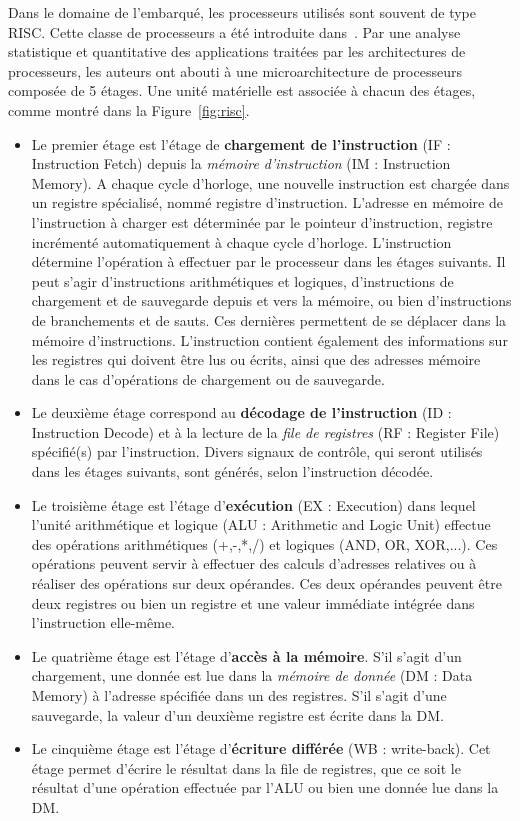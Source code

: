 Dans le domaine de l'embarqué, les processeurs utilisés sont souvent de type RISC. Cette classe de processeurs a été introduite dans~\cite{hennessy2011computer}. Par une analyse statistique et quantitative des applications traitées par les architectures de processeurs, les auteurs ont abouti à une microarchitecture de processeurs composée de 5 étages. Une unité matérielle est associée à chacun des étages, comme montré dans la Figure~\ref{fig:risc}.

\begin{itemize}
  \item Le premier étage est l'étage de \textbf{chargement de l'instruction} (IF : Instruction Fetch) depuis la \textit{mémoire d'instruction} (IM : Instruction Memory). A chaque cycle d'horloge, une nouvelle instruction est chargée dans un registre spécialisé, nommé registre d'instruction. L'adresse en mémoire de l'instruction à charger est déterminée par le pointeur d'instruction, registre incrémenté automatiquement à chaque cycle d'horloge. L'instruction détermine l'opération à effectuer par le processeur dans les étages suivants. Il peut s'agir d'instructions arithmétiques et logiques, d'instructions de chargement et de sauvegarde depuis et vers la mémoire, ou bien d'instructions de branchements et de sauts. Ces dernières permettent de se déplacer dans la mémoire d'instructions. L'instruction contient également des informations sur les registres qui doivent être lus ou écrits, ainsi que des adresses mémoire dans le cas d'opérations de chargement ou de sauvegarde.

  \item Le deuxième étage correspond au \textbf{décodage de l'instruction} (ID : Instruction Decode) et à la lecture de la \textit{file de registres} (RF : Register File) spécifié(s) par l'instruction. Divers signaux de contrôle, qui seront utilisés dans les étages suivants, sont générés, selon l'instruction décodée.

  \item Le troisième étage est l'étage d'\textbf{exécution} (EX : Execution) dans lequel l'unité arithmétique et logique (ALU : Arithmetic and Logic Unit) effectue des opérations arithmétiques (+,-,*,/) et logiques (AND, OR, XOR,...). Ces opérations peuvent servir à effectuer des calculs d'adresses relatives ou à réaliser des opérations sur deux opérandes. Ces deux opérandes peuvent être deux registres ou bien un registre et une valeur immédiate intégrée dans l'instruction elle-même.

  \item Le quatrième étage est l'étage d'\textbf{accès à la mémoire}. S'il s'agit d'un chargement, une donnée est lue dans la \textit{mémoire de donnée} (DM : Data Memory) à l'adresse spécifiée dans un des registres. S'il s'agit d'une sauvegarde, la valeur d'un deuxième registre est écrite dans la DM.

  \item Le cinquième étage est l'étage d'\textbf{écriture différée} (WB : write-back). Cet étage permet d'écrire le résultat dans la file de registres, que ce soit le résultat d'une opération effectuée par l'ALU ou bien une donnée lue dans la DM.
\end{itemize}


